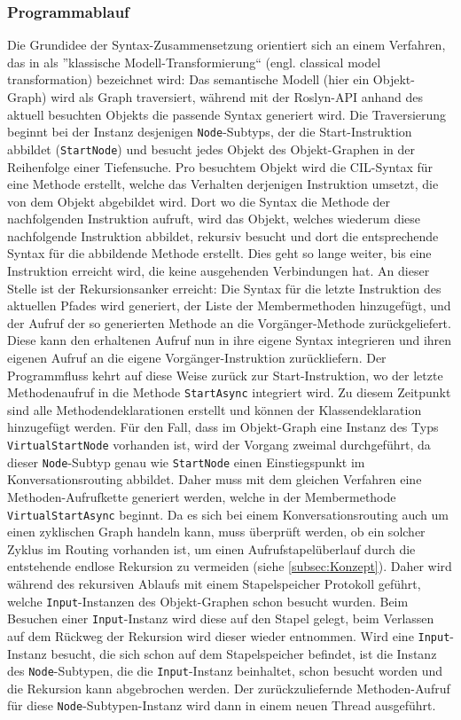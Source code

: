 \subsubsection{Programmablauf}
\label{subsubsec:Programablauf}
Die Grundidee der Syntax-Zusammensetzung orientiert sich an einem Verfahren, das in \cite[S. 272f]{Voelter:13} als ''klassische Modell-Transformierung`` (engl. classical model transformation) bezeichnet wird: Das semantische Modell (hier ein Objekt-Graph) wird als Graph traversiert, während mit der Roslyn-API anhand des aktuell besuchten Objekts die passende Syntax generiert wird. Die Traversierung beginnt bei der Instanz desjenigen \texttt{Node}-Subtyps, der die Start-Instruktion abbildet (\texttt{StartNode}) und besucht jedes Objekt des Objekt-Graphen in der Reihenfolge einer Tiefensuche. Pro besuchtem Objekt wird die CIL-Syntax für eine Methode erstellt, welche das Verhalten derjenigen Instruktion umsetzt, die von dem Objekt abgebildet wird. Dort wo die Syntax die Methode der nachfolgenden Instruktion aufruft, wird das Objekt, welches wiederum diese nachfolgende Instruktion abbildet, rekursiv besucht und dort die entsprechende Syntax für die abbildende Methode erstellt. Dies geht so lange weiter, bis eine Instruktion erreicht wird, die keine ausgehenden Verbindungen hat. An dieser Stelle ist der Rekursionsanker erreicht: Die Syntax für die letzte Instruktion des aktuellen Pfades wird generiert, der Liste der Membermethoden hinzugefügt, und der Aufruf der so generierten Methode an die Vorgänger-Methode zurückgeliefert. Diese kann den erhaltenen Aufruf nun in ihre eigene Syntax integrieren und ihren eigenen Aufruf an die eigene Vorgänger-Instruktion zurückliefern. Der Programmfluss kehrt auf diese Weise zurück zur Start-Instruktion, wo der letzte Methodenaufruf in die Methode \texttt{StartAsync} integriert wird. Zu diesem Zeitpunkt sind alle Methodendeklarationen erstellt und können der Klassendeklaration hinzugefügt werden. Für den Fall, dass im Objekt-Graph eine Instanz des Typs \texttt{VirtualStartNode} vorhanden ist, wird der Vorgang zweimal durchgeführt, da dieser \texttt{Node}-Subtyp genau wie \texttt{StartNode} einen Einstiegspunkt im Konversationsrouting abbildet. Daher muss mit dem gleichen Verfahren eine Methoden-Aufrufkette generiert werden, welche in der Membermethode \texttt{VirtualStartAsync} beginnt.
\newline
Da es sich bei einem Konversationsrouting auch um einen zyklischen Graph handeln kann, muss überprüft werden, ob ein solcher Zyklus im Routing vorhanden ist, um einen Aufrufstapelüberlauf durch die entstehende endlose Rekursion zu vermeiden (siehe \ref{subsec:Konzept}). Daher wird während des rekursiven Ablaufs mit einem Stapelspeicher Protokoll geführt, welche \texttt{Input}-Instanzen des Objekt-Graphen schon besucht wurden. Beim Besuchen einer \texttt{Input}-Instanz wird diese auf den Stapel gelegt, beim Verlassen auf dem Rückweg der Rekursion wird dieser wieder entnommen. Wird eine \texttt{Input}-Instanz besucht, die sich schon auf dem Stapelspeicher befindet, ist die Instanz des \texttt{Node}-Subtypen, die die \texttt{Input}-Instanz beinhaltet, schon besucht worden und die Rekursion kann abgebrochen werden. Der zurückzuliefernde Methoden-Aufruf für diese \texttt{Node}-Subtypen-Instanz wird dann in einem neuen Thread ausgeführt. 
